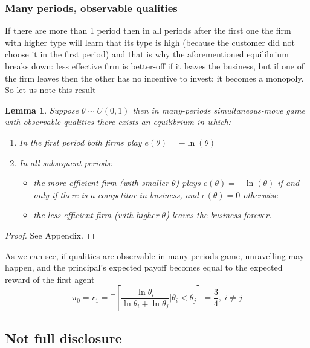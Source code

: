 \documentclass[a4paper]{article}
\newcommand{\expect}{\mathbb{E}}
\newtheorem{lemma}[theorem]{Lemma}
\begin{document}
\subsubsection{Many periods, observable qualities}

If there are more than 1 period then in all periods after the first one the firm with higher type will learn that its type is high (because the customer did not choose it in the first period) and that is why the aforementioned equilibrium breaks down: less effective firm is better-off if it leaves the business, but if one of the firm leaves then the other has no incentive to invest: it becomes a monopoly. So let us note this result
\begin{lemma}
	Suppose $\theta \sim U(0, 1)$ then in many-periods simultaneous-move game with observable qualities there exists an equilibrium in which:
	\begin{enumerate}
		\item In the first period both firms play $e(\theta) = -\ln(\theta)$
		\item In all subsequent periods:
		\begin{itemize}
			\item the more efficient firm (with smaller $\theta$) plays $e(\theta) = -\ln(\theta)$ if and only if there is a competitor in business, and $e(\theta) = 0$ otherwise
			\item the less efficient firm (with higher $\theta$) leaves the business forever.
		\end{itemize}
	\end{enumerate}
\end{lemma}
\begin{proof}
	See Appendix.
\end{proof}
As we can see, if qualities are observable in many periods game, unravelling may happen, and the principal's expected payoff becomes equal to the expected reward of the first agent $$\pi_0 = r_1 = \expect\left[\frac{\ln \theta_i}{\ln \theta_i + \ln \theta_j}\bigg| \theta_i < \theta_j\right] = \frac{3}{4},\ i \neq j$$





\subsection{Not full disclosure}
\end{document}
